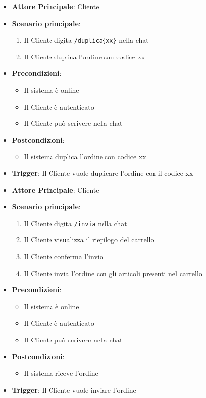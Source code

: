 \label{uc_44.3}
\begin{itemize}
    \item \textbf{Attore Principale}: Cliente
	\item \textbf{Scenario principale}:
	\begin{enumerate}
		\item Il Cliente digita \texttt{/duplica\{xx\}} nella chat
		\item Il Cliente duplica l'ordine con codice xx
	\end{enumerate}
	\item \textbf{Precondizioni}:
	\begin{itemize}
		\item Il sistema è online 
		\item Il Cliente è autenticato
		\item Il Cliente può scrivere nella chat
	\end{itemize}
	\item \textbf{Postcondizioni}:
	\begin{itemize}
		\item Il sistema duplica l'ordine con codice xx
	\end{itemize}
	\item \textbf{Trigger}: Il Cliente vuole duplicare l'ordine con il codice xx
\end{itemize}

\label{uc_44.4}
\begin{itemize}
    \item \textbf{Attore Principale}: Cliente
	\item \textbf{Scenario principale}:
	\begin{enumerate}
		\item Il Cliente digita \texttt{/invia} nella chat
		\item Il Cliente visualizza il riepilogo del carrello
		\item Il Cliente conferma l'invio
		\item Il Cliente invia l'ordine con gli articoli presenti nel carrello
	\end{enumerate}
	\item \textbf{Precondizioni}:
	\begin{itemize}
		\item Il sistema è online 
		\item Il Cliente è autenticato
		\item Il Cliente può scrivere nella chat
	\end{itemize}
	\item \textbf{Postcondizioni}:
	\begin{itemize}
		\item Il sistema riceve l'ordine
	\end{itemize}
	\item \textbf{Trigger}: Il Cliente vuole inviare l'ordine
\end{itemize}


